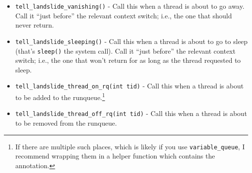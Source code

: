 \documentclass{article}
\begin{document}
\begin{itemize}
		Call it ``just before'' the action which makes the new thread runnable - whether your kernel just adds it to the runqueue (in which case the next annotation called would be \texttt{thread\_on\_rq}) or begins running it immediately (in which case \texttt{thread\_switch}); Landslide handles both cases.\footnote{It may help to think of this as setting a ``currently forking'' state flag in the calling thread: when the next annotation is called, Landslide will see the flag is set and act accordingly.
		}
	\item \texttt{tell\_landslide\_vanishing()} - Call this when a thread is about to go away.
		Call it ``just before'' the relevant context switch; i.e., the one that should never return.
	\item \texttt{tell\_landslide\_sleeping()} - Call this when a thread is about to go to sleep (that's \texttt{sleep()} the system call).
		Call it ``just before'' the relevant context switch; i.e., the one that won't return for as long as the thread requested to sleep.
	\item \texttt{tell\_landslide\_thread\_on\_rq(int tid)} - Call this when a thread is about to be added to the runqueue.\footnote{If there are multiple such places, which is likely if you use \texttt{variable\_queue}, I recommend wrapping them in a helper function which contains the annotation.}
	\item \texttt{tell\_landslide\_thread\_off\_rq(int tid)} - Call this when a thread is about to be removed from the runqueue.
\end{itemize}
\end{document}
